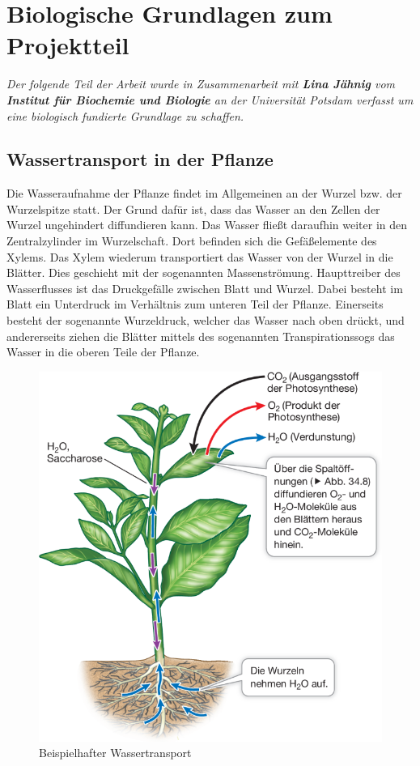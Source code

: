 \section{Biologische Grundlagen zum Projektteil}
\textit{Der folgende Teil der Arbeit wurde in Zusammenarbeit mit \textbf{Lina Jähnig} vom \textbf{Institut für Biochemie und Biologie} an der Universität Potsdam verfasst um eine biologisch fundierte Grundlage zu schaffen.}
\subsection{Wassertransport in der Pflanze}
Die Wasseraufnahme der Pflanze findet im Allgemeinen an der Wurzel bzw. der Wurzelspitze statt. Der Grund dafür ist, dass das Wasser an den Zellen der Wurzel ungehindert diffundieren kann. Das Wasser fließt daraufhin weiter in den Zentralzylinder im Wurzelschaft. Dort befinden sich die Gefäßelemente des Xylems. Das Xylem wiederum transportiert das Wasser von der Wurzel in die Blätter. Dies geschieht mit der sogenannten Massenströmung. Haupttreiber des Wasserflusses ist das Druckgefälle zwischen Blatt und Wurzel. Dabei besteht im Blatt ein Unterdruck im Verhältnis zum unteren Teil der Pflanze. Einerseits besteht der sogenannte Wurzeldruck, welcher das Wasser nach oben drückt, und andererseits ziehen die Blätter mittels des sogenannten Transpirationssogs das Wasser in die oberen Teile der Pflanze. \cite{urry2019}
\begin{figure}
    \centering
    \includegraphics[width=0.5\linewidth]{154381_10_De_34_Fig1_HTML.png}
    \caption{Beispielhafter Wassertransport}
    \label{fig:enter-label}
\end{figure}
